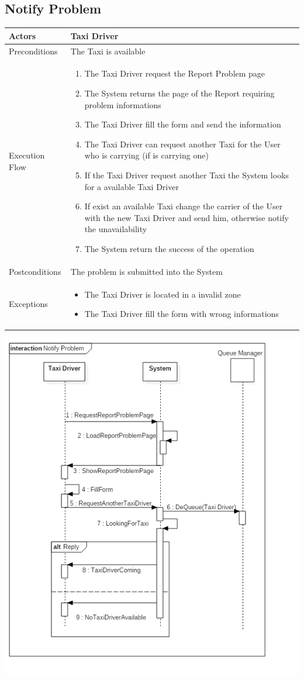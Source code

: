 \documentclass[english]{article}
\begin{document}
\subsection{Notify Problem}

\begin{tabular}{lp{8cm}}
\hline
Actors & Taxi Driver \\
\hline
Preconditions & The Taxi is available\\
\hline
Execution Flow &  
		\begin{enumerate}
			\item The Taxi Driver request the Report Problem page
			\item The System returns the page of the Report requiring problem informations
			\item The Taxi Driver fill the form and send the information
			\item The Taxi Driver can request another Taxi for the User who is carrying (if is carrying one)
			\item If the Taxi Driver request another Taxi the System looks for a available Taxi Driver
			\item If exist an available Taxi change the carrier of the User with the new Taxi Driver and send him, otherwise notify the unavailability
			\item The System return the success of the operation
		\end{enumerate} 
	\\ 
\hline
Postconditions & The problem is submitted into the System \\
\hline
Exceptions & 
	\begin{itemize} 
		\item The Taxi Driver is located in a invalid zone
		\item The Taxi Driver fill the form with wrong informations
	\end{itemize}
\end{tabular}

\includegraphics[width=\textwidth]{NotifyProblem}
\end{document}
